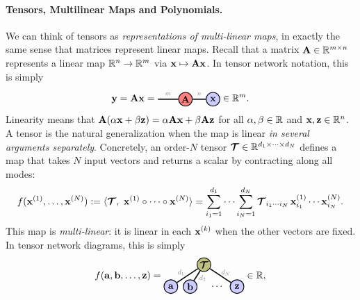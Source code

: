 \paragraph{Tensors, Multilinear Maps and Polynomials.}
We can think of tensors as \emph{representations of multi-linear maps}, in exactly the same sense that matrices represent linear maps. Recall that a matrix $\mathbf{A}\in\mathbb{R}^{m\times n}$ represents a linear map $\mathbb{R}^n\to\mathbb{R}^m$ via $\mathbf{x}\mapsto \mathbf{A}\mathbf{x}$. In tensor network notation, this is simply
$$
\yb = \Ab\xb
=
\begin{tikzpicture}[baseline=-0.5ex]
    \tikzset{tensor/.style = {minimum size = 0.5cm,shape = circle,thick,draw=black,inner sep = 0pt},
             edge/.style   = {thick,line width=.4mm},every loop/.style={}}
    \def\x{0}\def\y{0}
    \node[tensor,fill=red!50!white] (A) at (\x,\y){$\Ab$};
    \node[tensor,fill=blue!20!white] (x) at (\x+1,\y){$\xb$};
    \draw[edge] (A) -- (x) node [midway,above]{\scalebox{0.7}{\dimcolor{$n$}}};
    \draw[edge] (A) -- (\x-1,\y) node [midway,above]{\scalebox{0.7}{\dimcolor{$m$}}};
\end{tikzpicture}
\in\RR^{m}.
$$
Linearity means that $\mathbf{A}(\alpha \mathbf{x}+\beta \mathbf{z})=\alpha \mathbf{A}\mathbf{x}+\beta \mathbf{A}\mathbf{z}$ for all $\alpha,\beta\in\mathbb{R}$ and $\mathbf{x},\mathbf{z}\in\mathbb{R}^n$. A tensor is the natural generalization when the map is linear \emph{in several arguments separately}. Concretely, an order-$N$ tensor $\bm{\mathcal{T}}\in\mathbb{R}^{d_1\times\cdots\times d_N}$ defines a map that takes $N$ input vectors and returns a scalar by contracting along all modes:
$$
f(\mathbf{x}^{(1)},\dots,\mathbf{x}^{(N)})
:= \langle \bm{\mathcal{T}},\ \mathbf{x}^{(1)}\circ \cdots \circ \mathbf{x}^{(N)}\rangle
=
\sum_{i_1=1}^{d_1}\cdots\sum_{i_N=1}^{d_N}\bm{\mathcal{T}}_{i_1\cdots i_N}\,\mathbf{x}^{(1)}_{i_1}\cdots \mathbf{x}^{(N)}_{i_N}.
$$
This map is \emph{multi-linear}: it is linear in each $\mathbf{x}^{(k)}$ when the other vectors are fixed. In tensor network diagrams, this is simply
\[
f(\ab,\bb,\dots,\zb)
=
\begin{tikzpicture}[baseline=2ex]
    \tikzset{tensor/.style = {minimum size = 0.5cm,shape = circle,thick,draw=black,inner sep = 0pt},
             edge/.style   = {thick,line width=.4mm},
             every loop/.style={}}
    \def\x{0}\def\y{0}

    \node[tensor,fill=green!50!red!50!white] (T) at (\x,\y+0.8){$\Tt$};

    \node[tensor,fill=blue!20!white] (a) at (\x-1.2,\y){$\ab$};
    \node[tensor,fill=blue!20!white] (b) at (\x-0.5,\y){$\bb$};
    \node[draw=none] (dots) at (\x+0.5,\y){$\cdots$};
    \node[tensor,fill=blue!20!white] (z) at (\x+1.2,\y){$\zb$};

    \draw[edge] (T) -- (a) node [near end,above]{\scalebox{0.7}{\dimcolor{$d_1\ $}}};
    \draw[edge] (T) -- (b) node [near end,right]{\scalebox{0.7}{\dimcolor{$d_2$}}};
    \draw[edge] (T) -- (z) node [near end,above]{\scalebox{0.7}{\dimcolor{$d_N$}}};
\end{tikzpicture}
\in\RR,
\]
